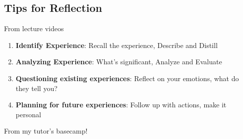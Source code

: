 \documentclass[math,code]{amznotes}
\theoremstyle{remark}
\begin{document}
\subsection{Tips for Reflection}
From lecture videos
\begin{enumerate}
    \item \textbf{Identify Experience}: Recall the experience, Describe and Distill
    \item \textbf{Analyzing Experience}: What's significant, Analyze and Evaluate
    \item \textbf{Questioning existing experiences}: Reflect on your emotions, what do they tell you?
    \item \textbf{Planning for future experiences}: Follow up with actions, make it personal
\end{enumerate}
From my tutor's basecamp!
\end{document}
